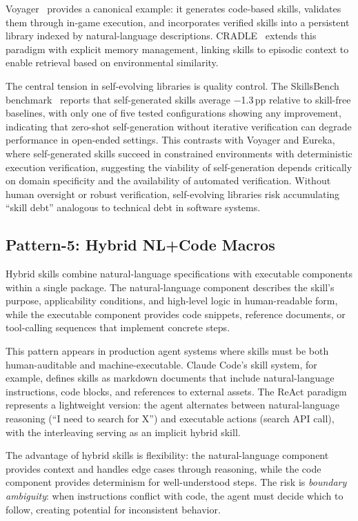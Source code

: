 \documentclass[conference, compsoc]{IEEEtran}
\theoremstyle{plain}
\begin{document}
Voyager~\cite{wang2023voyager} provides a canonical example: it generates code-based skills, validates them through in-game execution, and incorporates verified skills into a persistent library indexed by natural-language descriptions. CRADLE~\cite{tan2024cradle} extends this paradigm with explicit memory management, linking skills to episodic context to enable retrieval based on environmental similarity.

The central tension in self-evolving libraries is quality control. The SkillsBench benchmark~\cite{skillsbench2025} reports that self-generated skills average $-$1.3\,pp relative to skill-free baselines, with only one of five tested configurations showing any improvement, indicating that zero-shot self-generation without iterative verification can degrade performance in open-ended settings. This contrasts with Voyager and Eureka, where self-generated skills succeed in constrained environments with deterministic execution verification, suggesting the viability of self-generation depends critically on domain specificity and the availability of automated verification. Without human oversight or robust verification, self-evolving libraries risk accumulating ``skill debt'' analogous to technical debt in software systems.

\subsection{Pattern-5: Hybrid NL+Code Macros}
\label{sec:patterns:hybrid}

Hybrid skills combine natural-language specifications with executable components within a single package. The natural-language component describes the skill’s purpose, applicability conditions, and high-level logic in human-readable form, while the executable component provides code snippets, reference documents, or tool-calling sequences that implement concrete steps.

This pattern appears in production agent systems where skills must be both human-auditable and machine-executable. Claude Code's skill system, for example, defines skills as markdown documents that include natural-language instructions, code blocks, and references to external assets. The ReAct paradigm~\cite{yao2023react} represents a lightweight version: the agent alternates between natural-language reasoning (``I need to search for X'') and executable actions (search API call), with the interleaving serving as an implicit hybrid skill.

The advantage of hybrid skills is flexibility: the natural-language component provides context and handles edge cases through reasoning, while the code component provides determinism for well-understood steps. The risk is \emph{boundary ambiguity}: when instructions conflict with code, the agent must decide which to follow, creating potential for inconsistent behavior.
\end{document}
